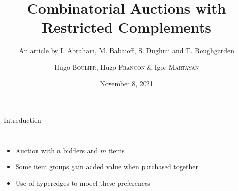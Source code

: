 \documentclass[aspectratio=169]{beamer}
\title{Combinatorial Auctions with Restricted Complements}
\subtitle{An article by I. Abraham, M. Babaioff, S. Dughmi and T. Roughgarden}
\author{Hugo \textsc{Boulier}, Hugo \textsc{Francon} \& Igor \textsc{Martayan}}
\date{November 8, 2021}
\begin{document}
{\maketitle}

\begin{frame}{Introduction}
    \begin{columns}
        \begin{itemize}
            \item Auction with $n$ bidders and $m$ items
            \item Some item groups gain added value when purchased together
            \item Use of hyperedges to model these preferences
        \end{itemize}


\end{columns}
\end{frame}
\end{document}
